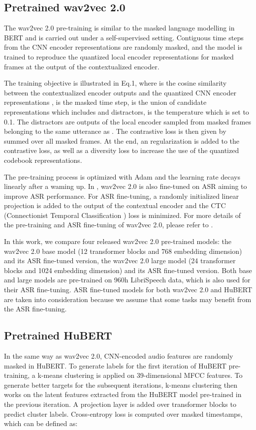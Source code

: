 \documentclass{article}
\begin{document}
 \subsection{Pretrained wav2vec 2.0}
The wav2vec 2.0 pre-training is similar to the masked language modelling in BERT \cite{Bert} and is carried out under a self-supervised setting. Contiguous time steps from the CNN encoder representations are randomly masked, and the model is trained to reproduce the quantized local encoder representations for masked frames at the output of the contextualized encoder.



The training objective is illustrated in Eq.1, where  is the cosine similarity between the contextualized encoder outputs  and the quantized CNN encoder representations ,  is the masked time step,  is the union of candidate representations  which includes  and  distractors,  is the temperature which is set to 0.1. The distractors are outputs of the local encoder sampled from masked frames belonging to the same utterance as . The contrastive loss is then given by  summed over all masked frames. At the end, an  regularization is added to the contrastive loss, as well as a diversity loss to increase the use of the quantized codebook representations.

The pre-training process is optimized with Adam \cite{Adam} and the learning rate decays linearly after a waming up. In \cite{wav2vec2}, wav2vec 2.0 is also fine-tuned on ASR aiming to improve ASR performance. For ASR fine-tuning, a randomly initialized linear projection is added to the output of the contextual encoder and the CTC (Connectionist Temporal Classification \cite{CTC}) loss is minimized. For more details of the pre-training and ASR fine-tuning of wav2vec 2.0, please refer to \cite{wav2vec2}.

In this work, we compare four released wav2vec 2.0 pre-trained models: the wav2vec 2.0 base model (12 transformer blocks and 768 embedding dimension) and its ASR fine-tuned version, the wav2vec 2.0 large model (24 transformer blocks and 1024 embedding dimension) and its ASR fine-tuned version. Both base and large models are pre-trained on 960h LibriSpeech \cite{LibriSpeech} data, which is also used for their ASR fine-tuning. ASR fine-tuned models for both wav2vec 2.0 and HuBERT are taken into consideration because we assume that some tasks may benefit from the ASR fine-tuning.


\subsection{Pretrained HuBERT}
In the same way as wav2vec 2.0, CNN-encoded audio features are randomly masked in HuBERT. To generate labels for the first iteration of HuBERT pre-training, a k-means clustering is applied on 39-dimensional MFCC features. To generate better targets for the subsequent iterations, k-means clustering then works on the latent features extracted from the HuBERT model pre-trained in the previous iteration. A projection layer is added over transformer blocks to predict cluster labels. Cross-entropy loss is computed over masked timestamps, which can be defined as: 
\end{document}
